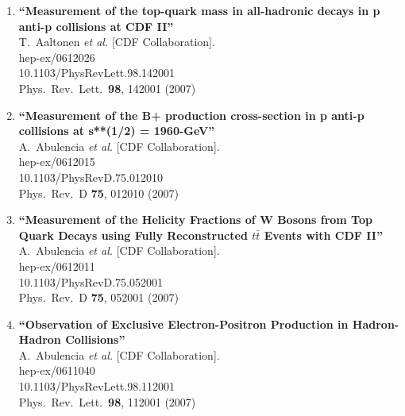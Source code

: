 \documentclass{article}
\begin{document}
\begin{enumerate}
\item%
{\bf ``Measurement of the top-quark mass in all-hadronic decays in p anti-p collisions at CDF II''}
  \\{}T.~Aaltonen {\it et al.}  [CDF Collaboration].
  \\{}hep-ex/0612026
    \\{}10.1103/PhysRevLett.98.142001
\\{}Phys.\ Rev.\ Lett.\  {\bf 98}, 142001 (2007) %


\item%
{\bf ``Measurement of the B+ production cross-section in p anti-p collisions at s**(1/2) = 1960-GeV''}
  \\{}A.~Abulencia {\it et al.}  [CDF Collaboration].
  \\{}hep-ex/0612015
    \\{}10.1103/PhysRevD.75.012010
\\{}Phys.\ Rev.\ D {\bf 75}, 012010 (2007) %


\item%
{\bf ``Measurement of the Helicity Fractions of W Bosons from Top Quark Decays using Fully Reconstructed \boldmath${t\bar{t}}$ Events with CDF II''}
  \\{}A.~Abulencia {\it et al.}  [CDF Collaboration].
  \\{}hep-ex/0612011
    \\{}10.1103/PhysRevD.75.052001
\\{}Phys.\ Rev.\ D {\bf 75}, 052001 (2007) %


\item%
{\bf ``Observation of Exclusive Electron-Positron Production in Hadron-Hadron Collisions''}
  \\{}A.~Abulencia {\it et al.}  [CDF Collaboration].
  \\{}hep-ex/0611040
    \\{}10.1103/PhysRevLett.98.112001
\\{}Phys.\ Rev.\ Lett.\  {\bf 98}, 112001 (2007) %



\end{enumerate}
\end{document}
